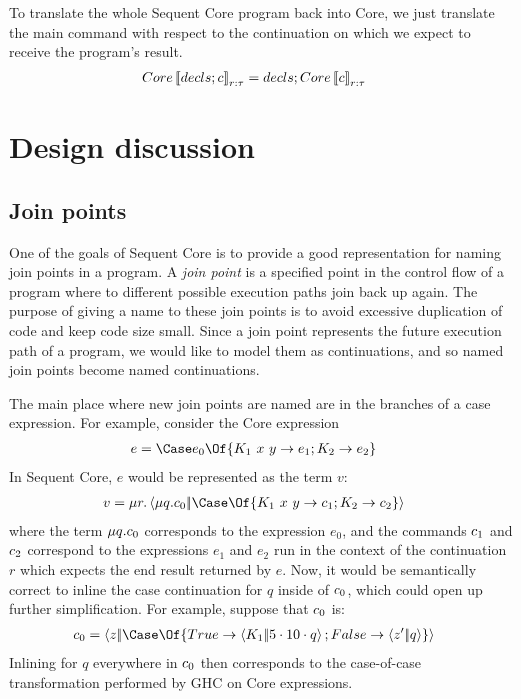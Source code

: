 \documentclass{article}
\begin{document}
To translate the whole Sequent Core program back into Core, we just translate
the main command with respect to the continuation on which we expect to receive
the program's result.
\begin{align*}
  Core\left\llbracket{decls; c}\right\rrbracket_{r:\tau} &= decls; Core\left\llbracket{c}\right\rrbracket_{r:\tau}
\end{align*}

\section{Design discussion}
\label{sec:design-discussion}

\subsection{Join points}

One of the goals of Sequent Core is to provide a good representation for naming
join points in a program.  A \emph{join point} is a specified point in the
control flow of a program where to different possible execution paths join back
up again.  The purpose of giving a name to these join points is to avoid
excessive duplication of code and keep code size small.  Since a join point
represents the future execution path of a program, we would like to model them
as continuations, and so named join points become named continuations.

The main place where new join points are named are in the branches of a case
expression.  For example, consider the Core expression
\begin{align*}
  e &= \Case e_0 \Of \{ K_1 ~ x ~ y \to e_1; K_2 \to e_2 \}
\end{align*}
In Sequent Core, $e$ would be represented as the term $v$:
\begin{align*}
  v
  &=
  \comp{r}
    \cut
    {\comp{q}\com_0}
    {\Case\Of \{ K_1 ~ x ~ y \to \com_1; K_2 \to \com_2 \}}
\end{align*}
where the term $\mu{q}.c_0$ corresponds to the expression $e_0$, and the
commands $c_1$ and $c_2$ correspond to the expressions $e_1$ and $e_2$ run
in the context of the continuation $r$ which expects the end result returned by
$e$.  Now, it would be semantically correct to inline the case continuation for
$q$ inside of $c_0$, which could open up further simplification.  For
example, suppose that $c_0$ is:
\begin{align*}
  \com_0
  &=
  \cut{z}{\Case\Of \{ True \to \cut{K_1}{\app{5}{\app{10}{q}}}; False \to \cut{z'}{q} \}}
\end{align*}
Inlining for $q$ everywhere in $c_0$ then corresponds to the case-of-case
transformation performed by GHC on Core expressions.
\end{document}
